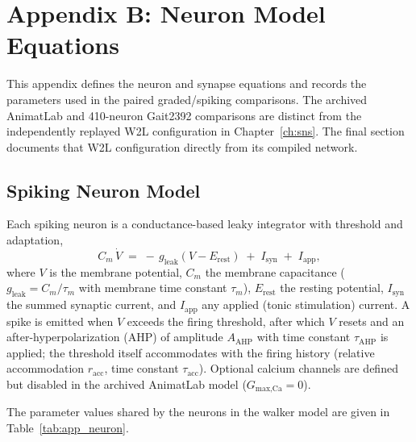 \chapter{Appendix B: Neuron Model Equations}\label{app:neuron_equations}
\graphicspath{{../Figures/93-AppendixB/}{figs/93-AppendixB/}}

This appendix defines the neuron and synapse equations and records the parameters used in the paired graded/spiking comparisons. The archived AnimatLab and 410-neuron Gait2392 comparisons are distinct from the independently replayed W2L configuration in Chapter~\ref{ch:sns}. The final section documents that W2L configuration directly from its compiled network.

\section{Spiking Neuron Model}

Each spiking neuron is a conductance-based leaky integrator with threshold and adaptation,
\begin{equation}
    C_{m}\,\dot{V} \;=\; -\,g_{\text{leak}}\left(V - E_{\text{rest}}\right)
                      \;+\; I_{\text{syn}} \;+\; I_{\text{app}},
    \label{eq:app_membrane}
\end{equation}
where $V$ is the membrane potential, $C_{m}$ the membrane capacitance ($g_{\text{leak}} = C_{m}/\tau_{m}$ with membrane time constant $\tau_{m}$), $E_{\text{rest}}$ the resting potential, $I_{\text{syn}}$ the summed synaptic current, and $I_{\text{app}}$ any applied (tonic stimulation) current. A spike is emitted when $V$ exceeds the firing threshold, after which $V$ resets and an after-hyperpolarization (AHP) of amplitude $A_{\text{AHP}}$ with time constant $\tau_{\text{AHP}}$ is applied; the threshold itself accommodates with the firing history (relative accommodation $r_{\text{acc}}$, time constant $\tau_{\text{acc}}$). Optional calcium channels are defined but disabled in the archived AnimatLab model ($G_{\text{max,Ca}} = 0$).

The parameter values shared by the neurons in the walker model are given in Table~\ref{tab:app_neuron}.

